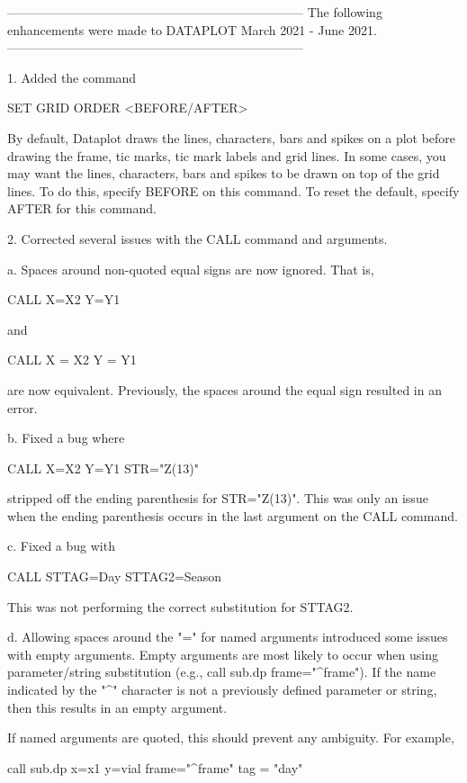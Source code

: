 -----------------------------------------------------------------------
The following enhancements were made to DATAPLOT
March 2021 - June 2021.
-----------------------------------------------------------------------

 1. Added the command

      SET GRID ORDER <BEFORE/AFTER>

    By default, Dataplot draws the lines, characters, bars and
    spikes on a plot before drawing the frame, tic marks, tic mark
    labels and grid lines.  In some cases, you may want the lines,
    characters, bars and spikes to be drawn on top of the grid lines.
    To do this, specify BEFORE on this command.  To reset the default,
    specify AFTER for this command.

 2. Corrected several issues with the CALL command and arguments.

    a. Spaces around non-quoted equal signs are now ignored.  That is,

           CALL X=X2 Y=Y1

        and

           CALL X = X2 Y = Y1

        are now equivalent.  Previously, the spaces around the equal
        sign resulted in an error.

    b. Fixed a bug where

           CALL X=X2 Y=Y1 STR="Z(13)"

       stripped off the ending parenthesis for STR="Z(13)".  This was
       only an issue when the ending parenthesis occurs in the last
       argument on the CALL command.

    c. Fixed a bug with

           CALL STTAG=Day STTAG2=Season

        This was not performing the correct substitution for STTAG2.

     d. Allowing spaces around the "=" for named arguments introduced
        some issues with empty arguments.  Empty arguments are most
        likely to occur when using parameter/string substitution
        (e.g., call sub.dp frame="^frame").  If the name indicated by
        the "^" character is not a previously defined parameter or
        string, then this results in an empty argument.

        If named arguments are quoted, this should prevent any
        ambiguity.  For example,

            call sub.dp   x=x1  y=vial  frame="^frame" tag = "day"

